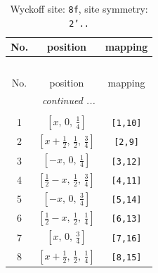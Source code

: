 \documentclass[fleqn,8pt]{jsarticle}
\begin{document}
\begin{longtable}{ccc}
\caption{Wyckoff site: {\tt 8f}, site symmetry: {\tt 2'..}}
 \\
 \hline \hline
No. & position & mapping \\ \hline \endfirsthead

\multicolumn{2}{l}{\tablename\ \thetable{}} \\
 \hline \hline
No. & position & mapping \\ \hline \endhead

 \hline \hline
\multicolumn{2}{r}{\footnotesize\it continued ...} \\ \endfoot

 \hline \hline
\multicolumn{2}{r}{} \\ \endlastfoot

1 & $\left[ x,\, 0,\, \frac{1}{4} \right]$ & {\tt [1,10]} \\ \hline
2 & $\left[ x + \frac{1}{2},\, \frac{1}{2},\, \frac{3}{4} \right]$ & {\tt [2,9]} \\ \hline
3 & $\left[ - x,\, 0,\, \frac{1}{4} \right]$ & {\tt [3,12]} \\ \hline
4 & $\left[ \frac{1}{2} - x,\, \frac{1}{2},\, \frac{3}{4} \right]$ & {\tt [4,11]} \\ \hline
5 & $\left[ - x,\, 0,\, \frac{3}{4} \right]$ & {\tt [5,14]} \\ \hline
6 & $\left[ \frac{1}{2} - x,\, \frac{1}{2},\, \frac{1}{4} \right]$ & {\tt [6,13]} \\ \hline
7 & $\left[ x,\, 0,\, \frac{3}{4} \right]$ & {\tt [7,16]} \\ \hline
8 & $\left[ x + \frac{1}{2},\, \frac{1}{2},\, \frac{1}{4} \right]$ & {\tt [8,15]} \\
\end{longtable}
\renewcommand{\arraystretch}{1.2}
\end{document}
